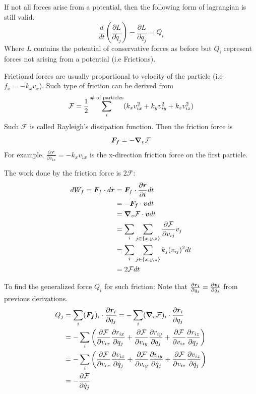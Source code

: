\documentclass[12pt]{article}
\begin{document}
\begin{theorem}
\textnormal{
If not all forces arise from a potential, then the following form of lagrangian is still valid. 
$$ \frac{d}{dt} \left(\frac{\partial L}{\partial \dot{q}_j}\right) - \frac{\partial L}{\partial q_j} = Q_i$$
Where $L$ contains the potential of conservative forces as before but $Q_i$ represent forces not arising from a  potential (i.e Frictions).
}
\end{theorem}

Frictional forces are usually proportional to velocity of the particle (i.e $f_x = -k_x v_x$). Such type of friction can be derived from $$\mathcal{F} = \frac{1}{2}\sum_i^{\textnormal{\# of particles}} (k_x v_{ix}^2 + k_y v_{iy}^2 + k_z v_{iz}^2)$$ Such $\mathcal{F}$ is called Rayleigh's dissipation function. Then the friction force is $$ \boldsymbol{F}_f = -\grad_v \mathcal{F} $$ 
For example, $\frac{\partial \mathcal{F}}{\partial v_{1x}} = - k_x v_{1x}$ is the x-direction friction force on the first particle.

The work done by the friction force is $2\mathcal{F}$:
$$ 
\begin{aligned}
 dW_f = \boldsymbol{F}_f \cdot d\boldsymbol{r} &= \boldsymbol{F}_f \cdot \frac{\partial \boldsymbol{r}}{\partial t} dt \\
  &=  - \boldsymbol{F}_f \cdot \boldsymbol{v} dt \\ 
  &= \grad_v \mathcal{F} \cdot \boldsymbol{v} dt \\ 
  &= \sum_i \sum_{j \in \{x,y,z\}} \frac{\partial \mathcal{F}}{\partial v_{ij}}v_j   \\
  &= \sum_i \sum_{j \in \{x,y,z\}} k_j (v_{ij})^2  dt \\
  &= 2 \mathcal{F} dt
\end{aligned}$$

To find the generalized force $Q_i$ for such friction: Note that $\frac{\partial \boldsymbol{r_i}}{\partial q_j} = \frac{\partial \boldsymbol{v_i}}{\partial \dot{q}_j}$ from previous derivations.
$$
\begin{aligned}
	Q_j &= \sum_i (\boldsymbol{F_f})_i \cdot \frac{\partial \boldsymbol{r}_i }{\partial q_j} = - \sum_i (\grad_v \mathcal{F})_i \cdot \frac{\partial \boldsymbol{r}_i }{\partial q_j}  \\ 
	&=-\sum_i \left( \frac{\partial \mathcal{F}}{\partial v_{ix}} \frac{\partial r_{ix} }{\partial q_j} + \frac{\partial \mathcal{F}}{\partial v_{iy}} \frac{\partial r_{iy} }{\partial q_j} + \frac{\partial \mathcal{F}}{\partial v_{iz}} \frac{\partial r_{iz} }{\partial q_j}\right) \\
	&=-\sum_i \left( \frac{\partial \mathcal{F}}{\partial v_{ix}} \frac{\partial v_{ix} }{\partial \dot{q}_j} + \frac{\partial \mathcal{F}}{\partial v_{iy}} \frac{\partial v_{iy} }{\partial \dot{q}_j} + \frac{\partial \mathcal{F}}{\partial v_{iz}} \frac{\partial v_{iz} }{\partial \dot{q}_j}\right) \\ 
	&= -  \frac{\partial \mathcal{F}}{\partial  \dot{q}_j}
\end{aligned}
$$
\end{document}
